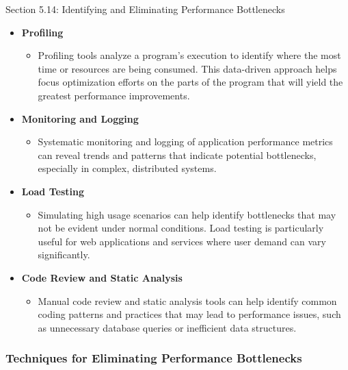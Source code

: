 \begin{notes}{Section 5.14: Identifying and Eliminating Performance Bottlenecks}
    \begin{itemize}
        \item \textbf{Profiling}
        \begin{itemize}
            \item Profiling tools analyze a program's execution to identify where the most time or resources are being consumed. This data-driven approach helps focus optimization efforts on the parts 
            of the program that will yield the greatest performance improvements.
        \end{itemize}
        \item \textbf{Monitoring and Logging}
        \begin{itemize}
            \item Systematic monitoring and logging of application performance metrics can reveal trends and patterns that indicate potential bottlenecks, especially in complex, distributed systems.
        \end{itemize}
        \item \textbf{Load Testing}
        \begin{itemize}
            \item Simulating high usage scenarios can help identify bottlenecks that may not be evident under normal conditions. Load testing is particularly useful for web applications and services 
            where user demand can vary significantly.
        \end{itemize}
        \item \textbf{Code Review and Static Analysis}
        \begin{itemize}
            \item Manual code review and static analysis tools can help identify common coding patterns and practices that may lead to performance issues, such as unnecessary database queries or 
            inefficient data structures.
        \end{itemize}
    \end{itemize}
    
    \subsubsection*{Techniques for Eliminating Performance Bottlenecks}
    

\end{notes}
